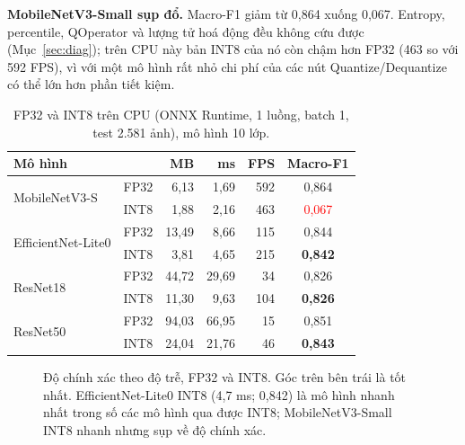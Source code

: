 \documentclass[10pt,a4paper,twocolumn]{article}
\begin{document}
\textbf{MobileNetV3-Small sụp đổ.} Macro-F1 giảm từ 0,864 xuống 0,067. Entropy, percentile, QOperator và lượng tử hoá động đều không cứu được (Mục~\ref{sec:diag}); trên CPU này bản INT8 của nó còn chậm hơn FP32 (463 so với 592 FPS), vì với một mô hình rất nhỏ chi phí của các nút Quantize/Dequantize có thể lớn hơn phần tiết kiệm.

\begin{table}[t]
\centering\small
\caption{FP32 và INT8 trên CPU (ONNX Runtime, 1 luồng, batch 1, test 2.581 ảnh), mô hình 10 lớp.}
\label{tab:int8}
\setlength{\tabcolsep}{3pt}
\begin{tabular}{@{}llrrrc@{}}
\toprule
Mô hình & & MB & ms & FPS & Macro-F1 \\
\midrule
\multirow{2}{*}{MobileNetV3-S} & FP32 & 6,13 & 1,69 & 592 & 0,864 \\
 & INT8 & 1,88 & 2,16 & 463 & \textcolor{red}{0,067} \\
\midrule
\multirow{2}{*}{EfficientNet-Lite0} & FP32 & 13,49 & 8,66 & 115 & 0,844 \\
 & INT8 & 3,81 & 4,65 & 215 & \textbf{0,842} \\
\midrule
\multirow{2}{*}{ResNet18} & FP32 & 44,72 & 29,69 & 34 & 0,826 \\
 & INT8 & 11,30 & 9,63 & 104 & \textbf{0,826} \\
\midrule
\multirow{2}{*}{ResNet50} & FP32 & 94,03 & 66,95 & 15 & 0,851 \\
 & INT8 & 24,04 & 21,76 & 46 & \textbf{0,843} \\
\bottomrule
\end{tabular}
\end{table}

\begin{figure}[t]
\centering
{}
\caption{Độ chính xác theo độ trễ, FP32 và INT8. Góc trên bên trái là tốt nhất. EfficientNet-Lite0 INT8 (4,7 ms; 0,842) là mô hình nhanh nhất trong số các mô hình qua được INT8; MobileNetV3-Small INT8 nhanh nhưng sụp về độ chính xác.}
\label{fig:int8}
\end{figure}
\end{document}
